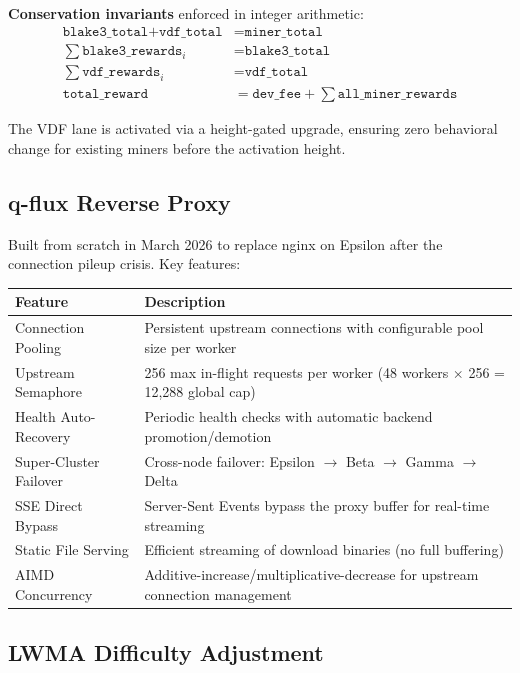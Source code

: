 \documentclass[12pt,a4paper]{article}
\begin{document}
\textbf{Conservation invariants} enforced in integer arithmetic:
\begin{align}
\texttt{blake3\_total} + \texttt{vdf\_total} &= \texttt{miner\_total} \\
\sum \texttt{blake3\_rewards}_i &= \texttt{blake3\_total} \\
\sum \texttt{vdf\_rewards}_i &= \texttt{vdf\_total} \\
\texttt{total\_reward} &= \texttt{dev\_fee} + \sum \texttt{all\_miner\_rewards}
\end{align}

The VDF lane is activated via a height-gated upgrade, ensuring zero behavioral change for existing miners before the activation height.

\subsection{q-flux Reverse Proxy}

Built from scratch in March 2026 to replace nginx on Epsilon after the connection pileup crisis. Key features:

\begin{center}
\begin{tabular}{@{}lp{8cm}@{}}
\toprule
\textbf{Feature} & \textbf{Description} \\
\midrule
Connection Pooling & Persistent upstream connections with configurable pool size per worker \\
Upstream Semaphore & 256 max in-flight requests per worker (48 workers $\times$ 256 = 12{,}288 global cap) \\
Health Auto-Recovery & Periodic health checks with automatic backend promotion/demotion \\
Super-Cluster Failover & Cross-node failover: Epsilon $\to$ Beta $\to$ Gamma $\to$ Delta \\
SSE Direct Bypass & Server-Sent Events bypass the proxy buffer for real-time streaming \\
Static File Serving & Efficient streaming of download binaries (no full buffering) \\
AIMD Concurrency & Additive-increase/multiplicative-decrease for upstream connection management \\
\bottomrule
\end{tabular}
\end{center}

\subsection{LWMA Difficulty Adjustment}
\end{document}

